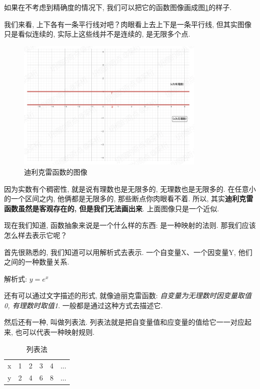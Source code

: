 如果在不考虑到精确度的情况下, 我们可以把它的函数图像画成图\ref{fig:img7_2}的样子. 

我们来看, 上下各有一条平行线对吧？肉眼看上去上下是一条平行线, 但其实图像只是看似连续的, 实际上这些线并不是连续的, 是无限多个点. 

\begin{figure}[ht]
  \centering
  \includegraphics[width=0.8\textwidth]{asset/97060faa-bcf8-4fdb-8f69-e42425ab9575.png}
  \caption{迪利克雷函数的图像}
  \label{fig:img7_2}
\end{figure}

因为实数有个稠密性, 就是说有理数也是无限多的, 无理数也是无限多的. 在任意小的一个区间之内, 他俩都是无限多的, 那些断点你肉眼看不着. 所以, 其实\textbf{迪利克雷函数虽然是客观存在的, 但是我们无法画出来}. 上面图像只是一个近似. 

现在我们知道, 函数抽象来说是一个什么样的东西: 是一种映射的法则. 那我们应该怎么样去表示它呢？

首先很熟悉的, 我们知道可以用解析式去表示. 一个自变量X、一个因变量Y, 他们之间的一种数量关系. 

解析式: \(y = e^x\)

还有可以通过文字描述的形式, 就像迪丽克雷函数: \textit{自变量为无理数时因变量取值0, 有理数时取值1}. 一般都是通过这种方式去描述它. 

然后还有一种, 叫做列表法. 列表法就是把自变量值和应变量的值给它一一对应起来, 也可以代表一种映射规则. 

\begin{table}[ht]
  \centering
  \begin{tabular}{llllll}
    \midrule
      x & 1 & 2 & 3 & 4 & ... \\
      y & 2 & 4 & 6 & 8 & ... \\
    \bottomrule
  \end{tabular}
  \caption{列表法}
  \label{tab:table7_1}
\end{table}

